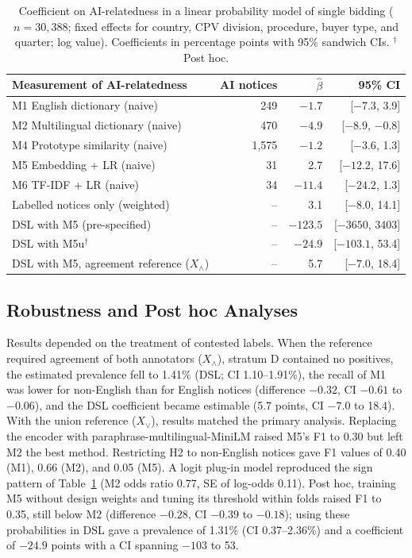 \begin{table}[t]
\caption{Coefficient on AI-relatedness in a linear probability model of single bidding ($n=30{,}388$; fixed effects for country, CPV division, procedure, buyer type, and quarter; log value). Coefficients in percentage points with 95\% sandwich CIs. $^\dagger$Post hoc.}\label{tab:reg}
\centering
\begin{tabular}{lrrr}
\toprule
Measurement of AI-relatedness & AI notices & $\hat\beta$ & 95\% CI \\
\midrule
M1 English dictionary (naive) & 249 & $-1.7$ & [$-7.3$, 3.9] \\
M2 Multilingual dictionary (naive) & 470 & $-4.9$ & [$-8.9$, $-0.8$] \\
M4 Prototype similarity (naive) & 1,575 & $-1.2$ & [$-3.6$, 1.3] \\
M5 Embedding + LR (naive) & 31 & 2.7 & [$-12.2$, 17.6] \\
M6 TF-IDF + LR (naive) & 34 & $-11.4$ & [$-24.2$, 1.3] \\
Labelled notices only (weighted) & -- & 3.1 & [$-8.0$, 14.1] \\
DSL with M5 (pre-specified) & -- & $-123.5$ & [$-3650$, 3403] \\
DSL with M5u$^\dagger$ & -- & $-24.9$ & [$-103.1$, 53.4] \\
DSL with M5, agreement reference ($X_\wedge$) & -- & 5.7 & [$-7.0$, 18.4] \\
\bottomrule
\end{tabular}
\end{table}

\subsection{Robustness and Post hoc Analyses}
\label{sec:robust}
Results depended on the treatment of contested labels. When the reference required agreement of both annotators ($X_\wedge$), stratum D contained no positives, the estimated prevalence fell to 1.41\% (DSL; CI 1.10--1.91\%), the recall of M1 was lower for non-English than for English notices (difference $-0.32$, CI $-0.61$ to $-0.06$), and the DSL coefficient became estimable (5.7 points, CI $-7.0$ to 18.4). With the union reference ($X_\vee$), results matched the primary analysis. Replacing the encoder with paraphrase-multilingual-MiniLM raised M5's F1 to 0.30 but left M2 the best method. Restricting H2 to non-English notices gave F1 values of 0.40 (M1), 0.66 (M2), and 0.05 (M5). A logit plug-in model reproduced the sign pattern of Table~\ref{tab:reg} (M2 odds ratio 0.77, SE of log-odds 0.11). Post hoc, training M5 without design weights and tuning its threshold within folds raised F1 to 0.35, still below M2 (difference $-0.28$, CI $-0.39$ to $-0.18$); using these probabilities in DSL gave a prevalence of 1.31\% (CI 0.37--2.36\%) and a coefficient of $-24.9$ points with a CI spanning $-103$ to 53.

